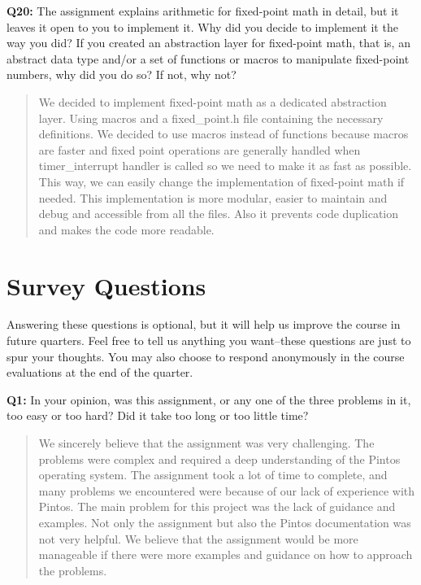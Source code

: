 \documentclass[a4paper,11pt]{paper}
\begin{document}
\textbf{Q20:} The assignment explains arithmetic for fixed-point math in detail, but it leaves it open to you to implement it.  Why did you decide to implement it the way you did?  If you created an abstraction layer for fixed-point math, that is, an abstract data type and/or a set of functions or macros to manipulate fixed-point numbers, why did you do so?  If not, why not?
\begin{quote}
We decided to implement fixed-point math as a dedicated abstraction layer. Using macros and a fixed\_point.h file containing
the necessary definitions. We decided to use macros instead of functions because macros are faster and fixed point operations are generally 
handled when timer\_interrupt handler is called so we need to make it as fast as possible.
This way, we can easily change the implementation of fixed-point math if needed.
This implementation is more modular, easier to maintain and debug and accessible from all the files.
Also it prevents code duplication and makes the code more readable. 
\end{quote}

\section{Survey Questions}

Answering these questions is optional, but it will help us improve the course in future quarters.  Feel free to tell us anything you want--these questions are just to spur your thoughts.  You may also choose to respond anonymously in the course evaluations at the end of the quarter.

\textbf{Q1:} In your opinion, was this assignment, or any one of the three problems in it, too easy or too hard?  Did it take too long or too little time?
\begin{quote}
  We sincerely believe that the assignment was very challenging. The problems were
	complex and required a deep understanding of the Pintos operating system. The
	assignment took a lot of time to complete, and many problems we encountered
	were because of our lack of experience with Pintos. The main problem for this
	project was the lack of guidance and examples. Not only the assignment but also
	the Pintos documentation was not very helpful. We believe that the assignment
	would be more manageable if there were more examples and guidance on how to
	approach the problems.
\end{quote}
\end{document}
